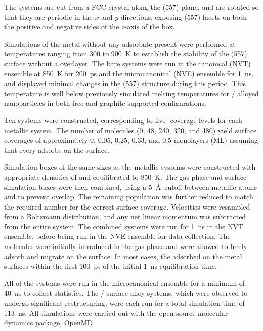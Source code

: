 \documentclass[journal = jpccck, manuscript = article]{achemso}
\begin{document}
The systems are cut from a FCC crystal along the (557) plane, and are
rotated so that they are periodic in the $x$ and $y$ directions,
exposing (557) facets on both the positive and negative sides of the
$z$-axis of the box.

Simulations of the metal without any adsorbate present were performed
at temperatures ranging from 300 to 900~K to establish the stability
of the (557) surface without a  overlayer.  The bare systems
were run in the canonical (NVT) ensemble at 850~K for 200~ps and the
microcanonical (NVE) ensemble for 1~ns, and displayed minimal changes
in the (557) structure during this period.  This temperature is well
below previously simulated melting temperatures for /
alloyed nanoparticles in both free and graphite-supported
configurations.\cite{Sankaranarayanan:2005bh,Sankaranarayanan:2005qf,Fernandez:2013yg}

Ten systems were constructed, corresponding to five -coverage
levels for each metallic system.  The number of  molecules (0,
48, 240, 320, and 480) yield surface coverages of approximately 0,
0.05, 0.25, 0.33, and 0.5 monolayers (ML) assuming that every 
adsorbs on the surface.

Simulation boxes of the same sizes as the metallic systems were
constructed with appropriate densities of  and equilibrated to
850~K. The gas-phase  and surface simulation boxes were then
combined, using a 5~\AA\ cutoff between metallic atoms and  to
prevent overlap. The remaining  population was further reduced
to match the required number for the correct surface coverage.
Velocities were resampled from a Boltzmann distribution, and any net
linear momentum was subtracted from the entire system.  The combined
systems were run for 1~ns in the NVT ensemble, before being run in the
NVE ensemble for data collection.  The  molecules were
initially introduced in the gas phase and were allowed to freely
adsorb and migrate on the surface.  In most cases, the 
adsorbed on the metal surfaces within the first 100~ps of the initial
1~ns equilibration time.

All of the  systems were run in the microcanonical ensemble for
a minimum of 40~ns to collect statistics. The / surface
alloy systems, which were observed to undergo significant
restructuring, were each run for a total simulation time of 113~ns.
All simulations were carried out with the open source molecular
dynamics package, OpenMD.\cite{openmd,OOPSE}
 
\end{document}

